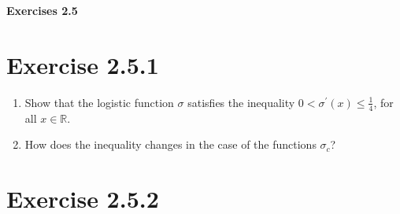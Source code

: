 \documentclass{exam}
\begin{document}
\begin{center}
    \textbf{\Large Exercises 2.5}    
\end{center}

\section*{Exercise 2.5.1}
\begin{enumerate}
    \item Show that the logistic function $\sigma$ satisfies the inequality $ 0 < \sigma^{\prime}(x) \leq \frac{1}{4}$, for all $x \in \mathbb{R}$.
    \item How does the inequality changes in the case of the functions $\sigma_{c}$?
\end{enumerate}  

\section*{Exercise 2.5.2}
\end{document}
